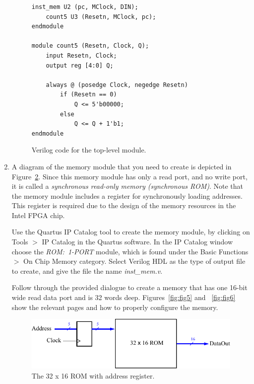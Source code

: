 \documentclass[epsfig,10pt,fullpage]{article}
\begin{document}
\begin{enumerate}
\begin{figure}[h]
\begin{center}
\begin{minipage}[t]{12.5 cm}
\begin{lstlisting}[name=proc]
    inst_mem U2 (pc, MClock, DIN);
    count5 U3 (Resetn, MClock, pc);
endmodule

module count5 (Resetn, Clock, Q);
    input Resetn, Clock;
    output reg [4:0] Q;

    always @ (posedge Clock, negedge Resetn)
        if (Resetn == 0)
            Q <= 5'b00000;
        else
            Q <= Q + 1'b1;
endmodule
\end{lstlisting}
\end{minipage}
\caption{Verilog code for the top-level module.}
\label{fig:procmem}
\end{center}
\end{figure}

\item
A diagram of the memory module that you need to create is depicted in Figure~\ref{fig:fig_ROM}.
Since this memory module has only a read port, and no write port, it is called a {\it synchronous 
read-only memory (synchronous ROM)}. Note that the memory module includes a register for 
synchronously loading addresses. This register is required due to the design of the memory 
resources in the Intel FPGA chip. 

Use the Quartus IP Catalog tool to create the memory module, by clicking on 
{\sf Tools} $>$ {\sf IP Catalog} in the Quartus software. In the IP Catalog window 
choose the {\it ROM:~1-PORT} module,
which is found under the {\sf Basic Functions $>$  On Chip Memory} category.  
Select {\sf Verilog HDL} as the type of output file to create, and give the file the name 
{\it inst\_mem.v}.

Follow through the provided dialogue to create a memory that has one 16-bit 
wide read data port and is 32 words deep. Figures~\ref{fig:fig5} and ~\ref{fig:fig6} show the 
relevant pages and how to properly configure the memory. 

\begin{figure}[t]
	\begin{center}
		\includegraphics[]{figures/figure_ROM.pdf}
	\end{center}
	\caption{The 32 {\sf x} 16 ROM with address register.}
	\label{fig:fig_ROM}
\end{figure}


\end{enumerate}
\end{document}
